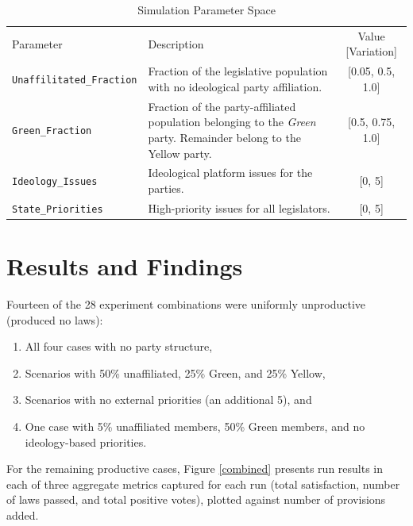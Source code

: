 \documentclass[pdftex,12pt]{llncs}
\begin{document}
\begin{table}
 \caption{Simulation Parameter Space}
 \begin{tabular}{lp{2.25in}c}
 \hline\noalign{\smallskip}
 Parameter & Description & Value [Variation] \\
 \noalign{\smallskip}
 \hline
 \noalign{\smallskip}
 \texttt{Unaffilitated\_Fraction} & Fraction of the legislative population with no ideological party  affiliation. & [0.05, 0.5, 1.0] \\
 \texttt{Green\_Fraction} & Fraction of the party-affiliated population belonging to the \textit{Green} party. Remainder belong to the Yellow party. & [0.5, 0.75, 1.0] \\
 \texttt{Ideology\_Issues} & Ideological platform issues for the parties. & [0, 5] \\
 \texttt{State\_Priorities} & High-priority issues for all legislators. & [0, 5] \\
 \hline
 \end{tabular}
 \label{params}
\end{table}


\section{Results and Findings}
%
Fourteen of the 28 experiment combinations were uniformly unproductive (produced no laws):
\begin{enumerate}
\item All four cases with no party structure,
\item Scenarios with 50\% unaffiliated, 25\% Green, and 25\% Yellow,
\item Scenarios with no external priorities (an additional 5), and
\item One case with 5\% unaffiliated members, 50\% Green members, and no ideology-based priorities.
\end{enumerate}
For the remaining productive cases, Figure \ref{combined} presents run results in each of three aggregate metrics captured for each run (total satisfaction, number of laws passed, and total positive votes), plotted against number of provisions added. 
\end{document}
